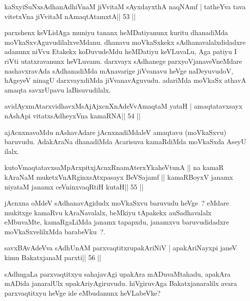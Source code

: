 \begin{shl}
kaSxyiSuNxsAdhanAdhiVnaM jiVvitaM sAyxdayxthA naqNAmf |
tatheYva tava vitetxVna jiVvitaM nAmaqtAtamxtA\hfill || 53 ||
\end{shl}

\begin{artha}
parxshenx keVLidAga muniyu tananx heMDatiyanunx kuritu dhanadiMda
moVkaSxvAguvudilalxveMdanu. dhanavu moVkaSxkekx sAdhanavalalxdidadxre
adanunx niVvu Etakekx koDuvudeMdu heMDatiyu keVLuvaLu, Aga patiyu I
riVti utatxravanunx heVLuvanu. darxvayx sAdhanege parxyoVjanaveVneMdare 
nashavxravAda sAdhanadiMda mAnavarige jiVvanavu heVge naDeyuvudoV,
hAgeyeV ninagU darxvayxdiMda jiVvanavAguvudu. adariMda moVkaSx athavA
amaqta savxrUpavu laBisuvudilalx.
\end{artha}


\begin{shl}
avidAyxmAtarxvidhavxMsAjAjxcnXnAdeVvAmaqtaM yataH |
amaqtatavxsayx nA\s\s shA\s pi vitatxsAdheyxVna kamaRNA\hfill || 54 ||
\end{shl}

\begin{artha}
ajAcnxnavoMdu nAshavAdare jAcnxnadiMdaleV amaqtavu (moVkaSxvu)
baruvudu. AdakAraNa dhanadiMda Acarisuva kamaRdiMda moVkaSxda AseyU 
ilalx.
\end{artha}

\begin{shl}
kutoV\s maqtatavxsaMpArxpitxjAcnxRnamAterxYkaheVtunA ||
na kamaR kAraNaM muketxVnARginxsAtxpasayx BeVSajamf ||
kamaRBoyxV janamx niyataM janamx ceVninxvaqRtiH kutaH\hfill || 55 ||
\end{shl}

\begin{artha}
jAcnxna oMdeV sAdhanavAgidudx moVkaSxvu baruvudu heVge~? eMdare mukitxge kamaRvu kAraNavalalx, beMkiyu tApakekx auSadhavalalx eMbuvaMte, kamaRgaLiMda janamx tapapxdu, janamxvu baruvudidadxre moVkaSxvelilxMda barabeVku~?.
\end{artha}

\begin{shl}
savxBAvAdeVva sAdhUnAM parxvaqtitxrupakAriNiV |
apakAriNayxpi janeV kimu BakatxjanaM parxti\hfill || 56 ||
\end{shl}

\begin{artha}
sAdhugaLa parxvaqtitxyu sahajavAgi upakAra mADuvaMtahadu, apakAra mADida janaralUlx upakAriyAgiruvudu. hiVgiruvAga Bakatxjanaralilx avara parxvaqtitxyu heVge ide eMbudanunx heVLabeVke?
\end{artha}

